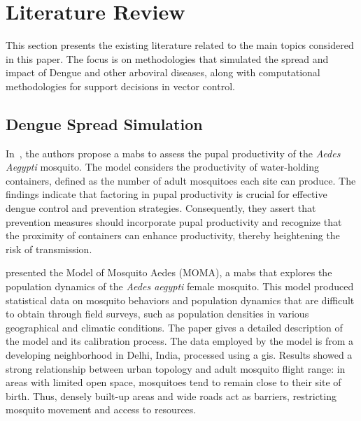 \chapter{Literature Review}\label{sec:literature-review}

\def\checkmark{\tikz\fill[scale=0.4](0,.35) -- (.25,0) -- (1,.7) -- (.25,.15) --
	cycle;}

This section presents the existing literature related to the main topics
considered in this paper. The focus is on methodologies that simulated the
spread and impact of Dengue and other arboviral diseases, along with
computational methodologies for support decisions in vector control.

\section{Dengue Spread Simulation}\label{sec:dengue-spread-simulation}

In~\cite{Borges2015}, the authors propose a \gls{mabs} to assess the pupal
productivity of the \textit{Aedes Aegypti} mosquito. The model considers the
productivity of water-holding containers, defined as the number of adult
mosquitoes each site can produce. The findings indicate that factoring in pupal
productivity is crucial for effective dengue control and prevention strategies.
Consequently, they assert that prevention measures should incorporate pupal
productivity and recognize that the proximity of containers can enhance
productivity, thereby heightening the risk of transmission.

\cite{maneerat:2016} presented the Model of Mosquito Aedes (MOMA), a \gls{mabs}
that explores the population dynamics of the \textit{Aedes aegypti} female
mosquito. This model produced statistical data on mosquito behaviors and
population dynamics that are difficult to obtain through field surveys, such as
population densities in various geographical and climatic conditions. The paper
gives a detailed description of the model and its calibration process. The data
employed by the model is from a developing neighborhood in Delhi, India,
processed using a \gls{gis}. Results showed a strong relationship between urban
topology and adult mosquito flight range: in areas with limited open space,
mosquitoes tend to remain close to their site of birth. Thus, densely built-up
areas and wide roads act as barriers, restricting mosquito movement and access
to resources.


